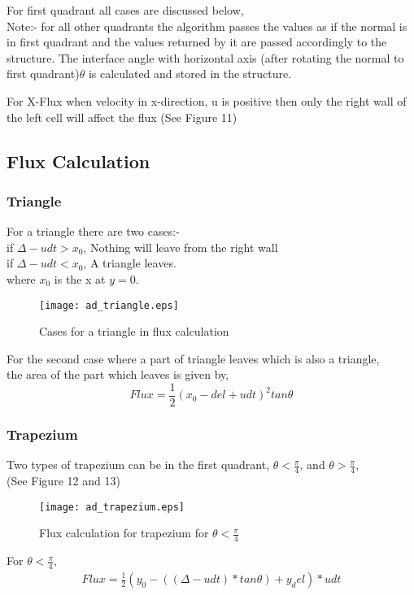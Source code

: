 For first quadrant all cases are discussed below, \\
Note:- for all other quadrants the algorithm passes the values as if the normal is in first quadrant and the values returned by it are passed accordingly to 
the structure. The interface angle with horizontal axis (after rotating the normal to first quadrant)$\theta$ is calculated and stored in the structure.

For X-Flux when velocity in x-direction, u is positive then only the right wall of the left cell will affect the flux (See Figure 11)
\subsection{Flux Calculation}
\subsubsection{Triangle}
For a triangle there are two cases:-\\
if $\Delta-udt>x_0$, Nothing will leave from the right wall \\
if $\Delta-udt<x_0$, A triangle leaves. \\
where $x_0$ is the x at $y=0$.
\begin{figure}[H]
 \centering
 \texttt{[image: ad\_triangle.eps]}
 \caption{Cases for a triangle in flux calculation}
\end{figure}
For the second case where a part of triangle leaves which is also a triangle, \\
the area of the part which leaves is given by,
\begin{equation*}
 Flux = \frac{1}{2}(x_0 - del + udt)^2 tan\theta
\end{equation*}

\subsubsection{Trapezium}
Two types of trapezium can be in the first quadrant, $\theta<\frac{\pi}{4}$, and $\theta>\frac{\pi}{4}$, \\
(See Figure 12 and 13) \\
\begin{figure}[H]
\centering
 \texttt{[image: ad\_trapezium.eps]}
 \caption{Flux calculation for trapezium for $\theta<\frac{\pi}{4}$}
\end{figure}
For $\theta<\frac{\pi}{4}$,
\begin{eqnarray*}
 Flux = \frac{1}{2}( y_0 - ((\Delta - udt)*tan\theta) + y_del )*udt \\
\end{eqnarray*}

